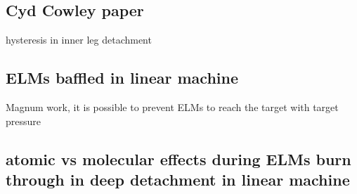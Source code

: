 \subsection{Cyd Cowley paper}
hysteresis in inner leg detachment
\subsection{ELMs baffled in linear machine}
Magnum work, it is possible to prevent ELMs to reach the target with target pressure
\subsection{atomic vs molecular effects during ELMs burn through in deep detachment in linear machine}






